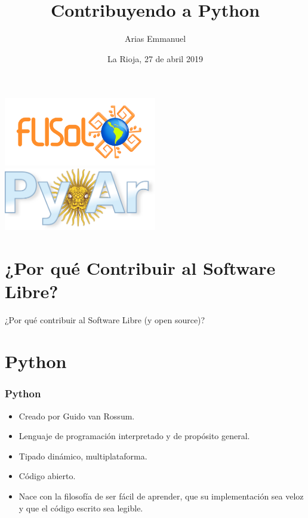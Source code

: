 \documentclass[spanish]{beamer}
\title[Contribuyendo a Python]{Contribuyendo a Python}
\author{Arias Emmanuel}
\institute[Flisol 2019]{15º Festival Latinoamericano de Instalación de Software Libre}
\date{La Rioja,  27 de abril 2019}
\begin{document}

\begin{frame}
	\titlepage
	\includegraphics[width=0.5\textwidth]{flisol.png}
	\includegraphics[width=0.5\textwidth]{pyar.png}
\end{frame}

\section{¿Por qué Contribuir al Software Libre?}
\begin{frame}
 \begin{center}
	 ¿Por qué contribuir al Software Libre (y open source)? 
 \end{center}
\end{frame}

\section{Python}
\begin{frame}
	\frametitle{Python}
	\begin{itemize}
		\item Creado por Guido van Rossum.
		\item Lenguaje de programación interpretado y de propósito general.
		\item Tipado dinámico, multiplataforma.
		\item Código abierto.
		\item Nace con la filosofía de ser fácil de aprender, que su implementación
			sea veloz y que el código escrito sea legible.
	\end{itemize}
\end{frame}
\end{document}
